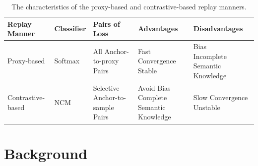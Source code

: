 \begin{table}[t]
\centering
\caption{The characteristics of the proxy-based and contrastive-based replay manners.}
\vspace{-2ex}
\label{table:characteristics}
\begin{tabular}{l|l|l|l|l}
\hline
Replay Manner  & Classifier     & Pairs of Loss      & Advantages  & Disadvantages \\ \hline
Proxy-based     & Softmax          & All Anchor-to-proxy Pairs          & \makecell[l]{Fast Convergence\\Stable}  & \makecell[l]{Bias\\Incomplete Semantic Knowledge}  \\\hline
Contrastive-based     & NCM          & Selective Anchor-to-sample Pairs          & \makecell[l]{Avoid Bias\\Complete Semantic Knowledge}  & \makecell[l]{Slow Convergence\\Unstable}  \\\hline
\end{tabular}
\vspace{-4ex}
\end{table}

\section{Background}
\label{sec:preliminary}

